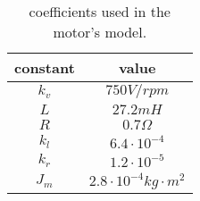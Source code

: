\begin{table}[bt]
    \centering
    \caption{coefficients used in the motor's model.}
    \label{tab:motorcoeffs}
    \begin{tabular}{c c}
        constant & value \\ \hline \hline
        $k_{v}$ & $750 V / rpm$ \\
        $L$ & $27.2mH$ \\
        $R$ & $0.7 \Omega$ \\
        $k_{l}$ & $6.4\cdot 10^{-4}$ \\
        $k_{r}$ & $1.2\cdot 10^{-5}$ \\
        $J_{m}$ & $2.8\cdot 10^{-4} kg\cdot m^{2}$ \\
    \end{tabular}

\end{table}

